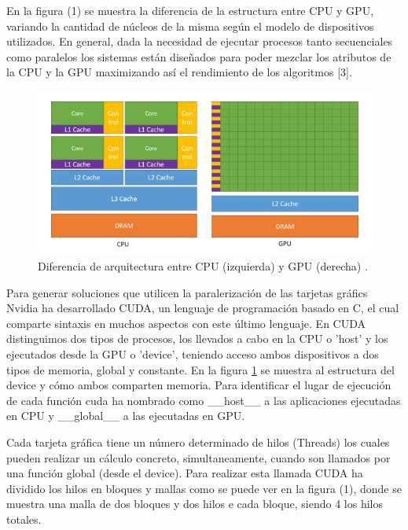 \documentclass[11pt,a4paper,twoside,pdf]{article}
\numberwithin{equation}{section}
\begin{document}
En la figura (1) se muestra la diferencia de la estructura entre CPU y GPU, variando la cantidad de núcleos de la misma según el modelo de dispositivos utilizados. En general, dada la necesidad de ejecutar procesos tanto secuenciales como paralelos los sistemas están diseñados para poder mezclar los atributos de la CPU y la GPU maximizando así el rendimiento de los algoritmos [3].

\begin{figure}[h]
\centering
\includegraphics[width=15cm]{Nvidia-CPU-GPU.jpg}				
\caption{Diferencia de arquitectura entre CPU (izquierda) y GPU (derecha) \cite{web}. }
\label{fig:arquitectura-cpu-gpu}
\end{figure}
\noindent

Para generar soluciones que utilicen la paralerización de las tarjetas gráfics Nvidia ha desarrollado CUDA, un lenguaje de programación basado en C, el cual comparte sintaxis en muchos aspectos con este último lenguaje. En CUDA distinguimos dos tipos de procesos, los llevados a cabo en la CPU o 'host' y los ejecutados desde la GPU o 'device', teniendo acceso ambos dispositivos a dos tipos de memoria, global y constante. En la figura \ref{fig:arquitectura-cpu-gpu} se muestra al estructura del device y cómo ambos comparten memoria. Para identificar el lugar de ejecución de cada función cuda ha nombrado como \_\_host\_\_ a las aplicaciones ejecutadas en CPU y \_\_global\_\_ a las ejecutadas en GPU.

Cada tarjeta gráfica tiene un número determinado de hilos (Threads) los cuales pueden realizar un cálculo concreto, simultaneamente, cuando son llamados por una función global (desde el device). Para realizar esta llamada CUDA ha dividido los hilos en bloques y mallas como se puede ver en la figura (1), donde se muestra una malla de dos bloques y dos hilos e cada bloque, siendo 4 los hilos totales.
\end{document}
